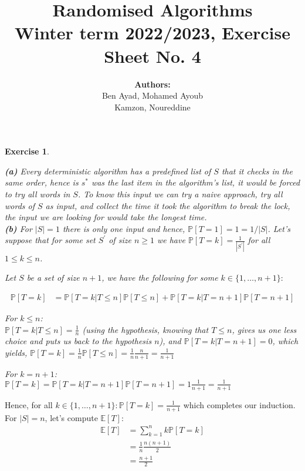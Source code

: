 \documentclass{article}
\title{Randomised Algorithms \\
Winter term 2022/2023, Exercise Sheet No. 4}
\author{
    \textbf{Authors:} \\
    Ben Ayad, Mohamed Ayoub \\
    Kamzon, Noureddine
}
\newtheorem{exo}{Exercise}
\def\P{\mathbb{P}}
\def\E{\mathbb{E}}
\begin{document}
\maketitle


\begin{exo}{\ \\}

\noindent
\textbf{(a)} Every deterministic algorithm has a predefined list of $S$ that it checks in the same order, hence is $s^*$ was the last item in the algorithm's list, it would be forced to try all words in $S$. To know this input we can try a naive approach, try all words of $S$ as input, and collect the time it took the algorithm to break the lock, the input we are looking for would take the longest time.  \\

\noindent
\textbf{(b)} For $|S|=1$ there is only one input and hence, $\P[T=1] = 1 = 1/|S|$. Let's suppose that for some set $S^{'}$ of size $n \geq 1$ we have $\P[T=k] = \frac{1}{|S^{'}|}$ for all $1 \leq k \leq n$. 

Let $S$ be a set of size $n+1$, we have the following for some $k \in \{1, \dots ,n+1\}\colon$

\begin{align*}
    \P[T = k] &= \P[T=k |T \leq n ]\P[T \leq n] +  \P[T=k |T = n+1 ]\P[T = n+1]
\end{align*}
 
For $k \leq n$: \\
$\P[T=k | T \leq n] = \frac{1}{n}$ (using the hypothesis, knowing that $T \leq n$, gives us one less choice and puts us back to the hypothesis $n$), and $\P[T=k |T = n+1 ] = 0$, which yields, $\P[T = k] = \frac{1}{n} \P[T \leq n] = \frac{1}{n} \frac{n}{n+1} = \frac{1}{n+1}   $

For $k = n+1$: \\
$\P[T=k] = \P[T=k|T=n+1] \P[T=n+1] = 1 \frac{1}{n+1} = \frac{1}{n+1} $
\end{exo}

Hence, for all $k \in \{1, \dots, n+1\}\colon \P[T=k] = \frac{1}{n+1}$ which completes our induction. \\

\noindent
For $|S| = n$, let's compute $\E[T]$:
\begin{align*}
    \E[T] &= \sum_{k=1}^{n} k \P[T=k] \\
          &= \frac{1}{n} \frac{n(n+1)}{2} \\
          &= \frac{n+1}{2} 
\end{align*}
\end{document}
